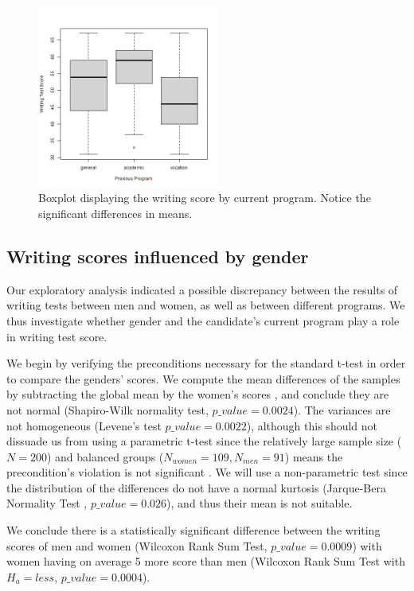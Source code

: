 \documentclass[10pt]{article}
\begin{document}
	\begin{figure}
		\includegraphics[width=6cm]{write_prog_boxplot.png}
		\centering
		\caption{Boxplot displaying the writing score by current program. Notice the significant differences in means.}
		\label{fig::write_prog}
	\end{figure}
	
	\subsection{Writing scores influenced by gender}
	Our exploratory analysis indicated a possible discrepancy between the results of writing tests between men and women, as well as between different programs. We thus investigate whether gender and the candidate's current program play a role in writing test score.
	
	We begin by verifying the preconditions necessary for the standard t-test in order to compare the genders' scores. We compute the mean differences of the samples by subtracting the global mean by the women's scores \parencite{means}, and conclude they are not normal (Shapiro-Wilk normality test, $p\_value = 0.0024$). The variances are not homogeneous (Levene's test $p\_value = 0.0022$), although this should not dissuade us from using a parametric t-test since the relatively large sample size ($N=200$) and balanced groups ($N_{women} = 109, N_{men} = 91$) means the precondition's violation is not significant \parencite{variances}. We will use a non-parametric test since the distribution of the differences do not have a normal kurtosis (Jarque-Bera Normality Test \cite{jarque}, $p\_value=0.026$), and thus their mean is not suitable.
	
	We conclude there is a statistically significant difference between the writing scores of men and women (Wilcoxon Rank Sum Test, $p\_value = 0.0009$) with women having on average 5 more score than men (Wilcoxon Rank Sum Test with $H_a = less$, $p\_value = 0.0004$).
	
\end{document}
